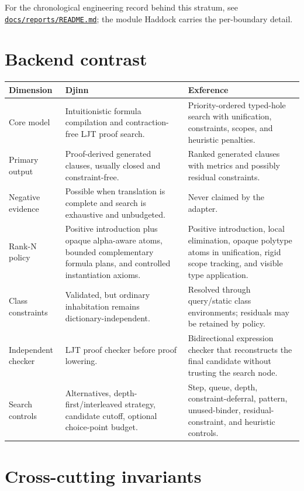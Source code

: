 \documentclass[10pt,letterpaper,oneside]{report}
\def\DjexBase{https://github.com/VladimirReshetnikov/Djex/blob/d3d9662598460316bdcd177ce6768c521e764aa8/}
\newcommand{\dpath}[1]{\href{\DjexBase#1}{\nolinkurl{#1}}}
\begin{document}
For the chronological engineering record behind this stratum, see \dpath{docs/reports/README.md}; the module Haddock carries the per-boundary detail.

\section{Backend contrast}

\begin{longtable}{@{}L{0.21\textwidth}L{0.34\textwidth}L{0.37\textwidth}@{}}
\toprule
\textbf{Dimension} & \textbf{Djinn} & \textbf{Exference} \\
\midrule
\endhead
Core model & Intuitionistic formula compilation and contraction-free LJT proof search. & Priority-ordered typed-hole search with unification, constraints, scopes, and heuristic penalties. \\
Primary output & Proof-derived generated clauses, usually closed and constraint-free. & Ranked generated clauses with metrics and possibly residual constraints. \\
Negative evidence & Possible when translation is complete and search is exhaustive and unbudgeted. & Never claimed by the adapter. \\
Rank-N policy & Positive introduction plus opaque alpha-aware atoms, bounded complementary formula plans, and controlled instantiation axioms. & Positive introduction, local elimination, opaque polytype atoms in unification, rigid scope tracking, and visible type application. \\
Class constraints & Validated, but ordinary inhabitation remains dictionary-independent. & Resolved through query/static class environments; residuals may be retained by policy. \\
Independent checker & LJT proof checker before proof lowering. & Bidirectional expression checker that reconstructs the final candidate without trusting the search node. \\
Search controls & Alternatives, depth-first/interleaved strategy, candidate cutoff, optional choice-point budget. & Step, queue, depth, constraint-deferral, pattern, unused-binder, residual-constraint, and heuristic controls. \\
\bottomrule
\end{longtable}

\section{Cross-cutting invariants}
\end{document}
